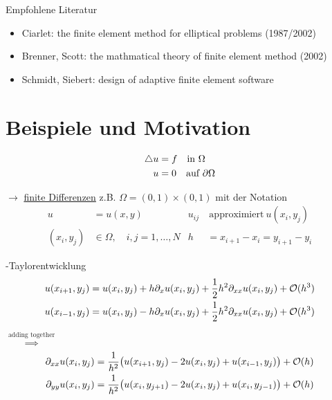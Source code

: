 
Empfohlene Literatur
\begin{itemize}
	\item Ciarlet: the finite element method for elliptical problems (1987/2002)\\
	\item Brenner, Scott: the mathmatical theory of finite element method (2002)\\
	\item Schmidt, Siebert: design of adaptive finite element software
\end{itemize}



\section{Beispiele und Motivation}

\begin{align*}
	\mathop{}\!\mathbin\bigtriangleup u &= f \quad  \text{in }  \Omega\\
		  	 u &= 0 \quad \text{auf } \partial\Omega
\end{align*}

$\rightarrow$ \underline{finite Differenzen}\enter
\enter
z.B. $\Omega = (0,1) \times (0,1)$ mit der Notation
\begin{align*}
	 u&= u(x,y)				 &   u_{ij}&\ \text{approximiert}\ u(x_i,y_j)\\
	(x_i, y_j) &\in \Omega, \quad i,j = 1,\dots,N&  h&= x_{i+1} - x_i = y_{i+1}-y_i
\end{align*}

-Taylorentwicklung
\begin{align*}
	u(x_{i+1},y_j) &= 	u(x_{i},y_j) + 	h\partial_x u(x_{i},y_j) + \frac{1}{2}h^2 \partial_{xx}	u(x_i,y_j) + \mathcal{O}(h^3)\\
	u(x_{i-1},y_j) &= 	u(x_{i},y_j) - 	h\partial_x u(x_{i},y_j) + \frac{1}{2}h^2 \partial_{xx}	u(x_i,y_j) + \mathcal{O}(h^3)\\
\end{align*}

$\stackrel{\text{adding together}}{\implies}$
\begin{align*}
	\partial_{xx} u(x_i,y_j) &= \frac{1}{h^2}\big(	u(x_{i+1},y_j) - 2u(x_i,y_j) + 	u(x_{i-1},y_j) \big) + \mathcal{O}(h)\\
	\partial_{yy} u(x_i,y_j) &= \frac{1}{h^2}\big(	u(x_i,y_{j+1}) - 2u(x_i,y_j) + 	u(x_i,y_{j-1}) \big) + \mathcal{O}(h)
\end{align*}

